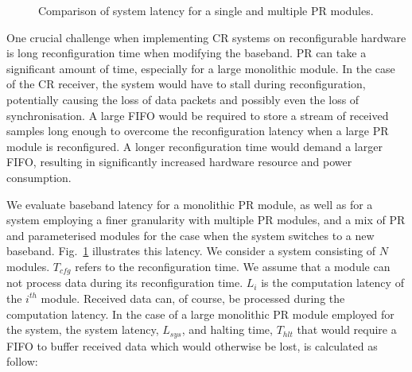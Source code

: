 \begin{figure}
\caption{Comparison of system latency for a single and multiple PR modules.}
\label{fig:timing}
\end{figure}

One crucial challenge when implementing CR systems on reconfigurable hardware is long reconfiguration time when modifying the baseband.
PR can take a significant amount of time, especially for a large monolithic module.
In the case of the CR receiver, the system would have to stall during reconfiguration, potentially causing the loss of data packets and possibly even the loss of synchronisation.
A large FIFO would be required to store a stream of received samples long enough to overcome the reconfiguration latency when a large PR module is reconfigured.
A longer reconfiguration time would demand a larger FIFO, resulting in significantly increased hardware resource and power consumption.

We evaluate baseband latency for a monolithic PR module, as well as for a system employing a finer granularity with multiple PR modules, and a mix of PR and parameterised modules for the case when the system switches to a new baseband.
Fig.~\ref{fig:timing} illustrates this latency. We consider a system consisting of $N$ modules. $T_{cfg}$ refers to the reconfiguration time.
We assume that a module can not process data during its reconfiguration time.
$L_{i}$ is the computation latency of the $i^{th}$ module. Received data can, of course, be processed during the computation latency. In the case of a large monolithic PR module employed for the system, the system latency, $L_{sys}$, and halting time, $T_{hlt}$ that would require a FIFO to buffer received data which would otherwise be lost, is calculated as follow:

